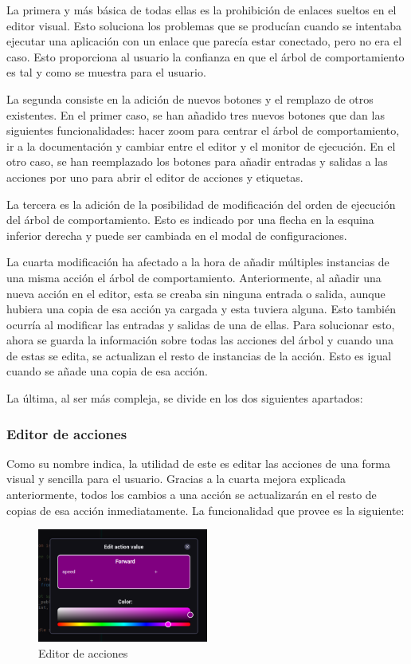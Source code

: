 La primera y más básica de todas ellas es la prohibición de enlaces sueltos en el editor visual. Esto soluciona los problemas que se producían cuando se intentaba ejecutar una aplicación con un enlace que parecía estar conectado, pero no era el caso. Esto proporciona al usuario la confianza en que el árbol de comportamiento es tal y como se muestra para el usuario.

La segunda consiste en la adición de nuevos botones y el remplazo de otros existentes. En el primer caso, se han añadido tres nuevos botones que dan las siguientes funcionalidades: hacer zoom para centrar el árbol de comportamiento, ir a la documentación y cambiar entre el editor y el monitor de ejecución. En el otro caso, se han reemplazado los botones para añadir entradas y salidas a las acciones por uno para abrir el editor de acciones y etiquetas.

La tercera es la adición de la posibilidad de modificación del orden de ejecución del árbol de comportamiento. Esto es indicado por una flecha en la esquina inferior derecha y puede ser cambiada en el modal de configuraciones.

La cuarta modificación ha afectado a la hora de añadir múltiples instancias de una misma acción el árbol de comportamiento. Anteriormente, al añadir una nueva acción en el editor, esta se creaba sin ninguna entrada o salida, aunque hubiera una copia de esa acción ya cargada y esta tuviera alguna. Esto también ocurría al modificar las entradas y salidas de una de ellas. Para solucionar esto, ahora se guarda la información sobre todas las acciones del árbol y cuando una de estas se edita, se actualizan el resto de instancias de la acción. Esto es igual cuando se añade una copia de esa acción.

La última, al ser más compleja, se divide en los dos siguientes apartados:

\subsubsection{Editor de acciones}

Como su nombre indica, la utilidad de este es editar las acciones de una forma visual y sencilla para el usuario. Gracias a la cuarta mejora explicada anteriormente, todos los cambios a una acción se actualizarán en el resto de copias de esa acción inmediatamente. La funcionalidad que provee es la siguiente:

\begin{figure}[H]
    \centering
    \includegraphics[width=0.5\textwidth]{figures/bt-avances/bt-edit.png}
    \caption{Editor de acciones}
    \label{fig:bt-act}
\end{figure}

